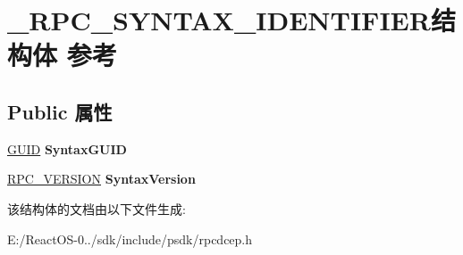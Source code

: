 \hypertarget{struct___r_p_c___s_y_n_t_a_x___i_d_e_n_t_i_f_i_e_r}{}\section{\+\_\+\+R\+P\+C\+\_\+\+S\+Y\+N\+T\+A\+X\+\_\+\+I\+D\+E\+N\+T\+I\+F\+I\+E\+R结构体 参考}
\label{struct___r_p_c___s_y_n_t_a_x___i_d_e_n_t_i_f_i_e_r}
\subsection*{Public 属性}
\begin{DoxyCompactItemize}
\item 
\mbox{\label{struct___r_p_c___s_y_n_t_a_x___i_d_e_n_t_i_f_i_e_r_a6e6be679ee011cfa94a954eb86eb5c79}} 
\hyperlink{interface_g_u_i_d}{G\+U\+ID} {\bfseries Syntax\+G\+U\+ID}
\item 
\mbox{\label{struct___r_p_c___s_y_n_t_a_x___i_d_e_n_t_i_f_i_e_r_a832cf2876b5d49e8e6543db3a4e1cf70}} 
\hyperlink{struct___r_p_c___v_e_r_s_i_o_n}{R\+P\+C\+\_\+\+V\+E\+R\+S\+I\+ON} {\bfseries Syntax\+Version}
\end{DoxyCompactItemize}


该结构体的文档由以下文件生成\+:\begin{DoxyCompactItemize}
\item 
E\+:/\+React\+O\+S-\/0../sdk/include/psdk/rpcdcep.\+h\end{DoxyCompactItemize}
